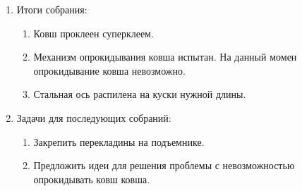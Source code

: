 \begin{enumerate}
\begin{enumerate}
    \end{enumerate}
    
	\item Итоги собрания: 
	\begin{enumerate}
	  \item Ковш проклеен суперклеем.
	  
	  \item Механизм опрокидывания ковша испытан. На данный момен опрокидывание ковша невозможно.
	  
	  \item Стальная ось распилена на куски нужной длины.
	  
    \end{enumerate}
    
	\item Задачи для последующих собраний:
	\begin{enumerate}
	  \item Закрепить перекладины на подъемнике.
	  
	  \item Предложить идеи для решения проблемы с невозможностью опрокидывать ковш ковша.
	  
    \end{enumerate}     
\end{enumerate}
\fillpage